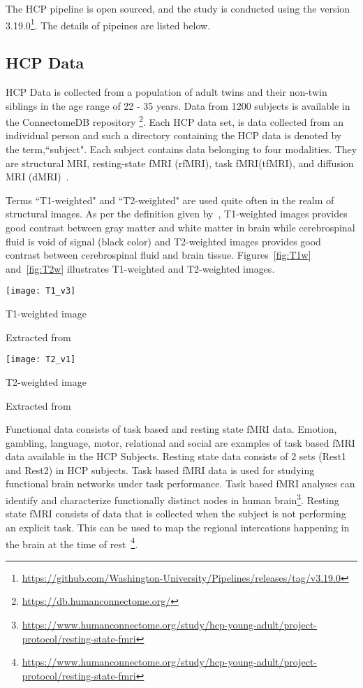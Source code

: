 The HCP pipeline is open sourced, and the study is conducted using the version 3.19.0\footnote{\url{https://github.com/Washington-University/Pipelines/releases/tag/v3.19.0}}. The details of pipeines are listed below.

\subsection{HCP Data}
HCP Data is collected from a population of adult twins and their non-twin siblings in the age range of 22 - 35 years. Data from 1200 subjects is available in the ConnectomeDB repository \footnote{\url{https://db.humanconnectome.org/}}. Each HCP data set, is data collected from an individual person and such a directory containing the HCP data is denoted by the term,``subject". Each subject contains data belonging to four modalities. They are structural MRI, resting-state fMRI (rfMRI), task fMRI(tfMRI), and diffusion MRI (dMRI)~\cite{HCPData}.

Terms ``T1-weighted" and ``T2-weighted" are used quite often in the realm of structural images. As per the definition given by~\cite{t1w_t2w}, T1-weighted images provides good contrast between gray matter and white matter in brain while cerebrospinal fluid is void of signal (black color) and T2-weighted images provides good contrast between cerebrospinal fluid and brain tissue. Figures~\ref{fig:T1w} and~\ref{fig:T2w} illustrates T1-weighted and T2-weighted images.\\

\begin{center}
  \texttt{[image: T1\_v3]}
  \caption{T1-weighted image}
  \label{fig:T1w}
  \caption*{Extracted from \cite{t1w_t2w}}
\end{center}

\begin{center}
  \texttt{[image: T2\_v1]}
  \caption{T2-weighted image}
  \label{fig:T2w}
  \caption*{Extracted from \cite{t1w_t2w}}
\end{center}

Functional data consists of task based and resting state fMRI data. Emotion, gambling, language, motor, relational and social are examples of task based fMRI data available in the HCP Subjects. Resting state data consists of 2 sets (Rest1 and Rest2) in HCP subjects. Task based fMRI data is used for studying functional brain networks under task performance. Task based fMRI analyses can identify and characterize functionally distinct nodes in human brain\footnote{\url{https://www.humanconnectome.org/study/hcp-young-adult/project-protocol/resting-state-fmri}}. Resting state fMRI consists of data that is collected when the subject is not performing an explicit task. This can be used to map the regional intercations happening in the brain at the time of rest~\footnote{\url{https://www.humanconnectome.org/study/hcp-young-adult/project-protocol/resting-state-fmri}}.

